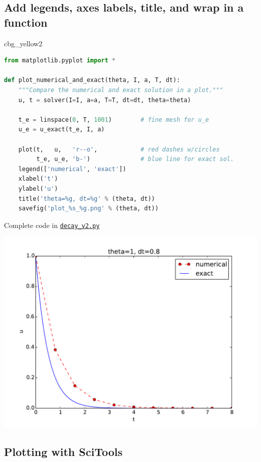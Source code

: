 \documentclass[%
oneside,                 %
final,                   %
10pt]{article}
\newenvironment{_cod_tight}[1]{
   \def\FrameCommand{\colorbox{#1}}
   \FrameRule0.6pt\MakeFramed {\FrameRestore}\vskip3mm}
   {\vskip0mm\endMakeFramed}
\newenvironment{cod}[1]{
\bgroup\rmfamily
\fboxsep=0mm\relax
\begin{_cod_tight}{#1}
\list{}{\parsep=-2mm\parskip=0mm\topsep=0pt\leftmargin=2mm
\rightmargin=2\leftmargin\leftmargin=4pt\relax}
\item\relax}
{\endlist\end{_cod_tight}\egroup}
\begin{document}
\subsection*{Add legends, axes labels, title, and wrap in a function}

\begin{cod}{cbg_yellow2}\begin{lstlisting}[language=Python,style=simple,xleftmargin=2mm]
from matplotlib.pyplot import *

def plot_numerical_and_exact(theta, I, a, T, dt):
    """Compare the numerical and exact solution in a plot."""
    u, t = solver(I=I, a=a, T=T, dt=dt, theta=theta)

    t_e = linspace(0, T, 1001)        # fine mesh for u_e
    u_e = u_exact(t_e, I, a)

    plot(t,   u,   'r--o',            # red dashes w/circles
         t_e, u_e, 'b-')              # blue line for exact sol.
    legend(['numerical', 'exact'])
    xlabel('t')
    ylabel('u')
    title('theta=%g, dt=%g' % (theta, dt))
    savefig('plot_%s_%g.png' % (theta, dt))
\end{lstlisting}\end{cod}
\noindent

Complete code in
\href{{http://tinyurl.com/ofkw6kc/alg/decay_v2.py}}{\nolinkurl{decay_v2.py}}



\centerline{\includegraphics[width=0.8\linewidth]{fig-alg/decay_v2.pdf}}




\subsection*{Plotting with SciTools}
\end{document}
